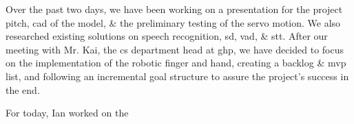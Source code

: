 
Over the past two days, we have been working on a presentation for the project pitch, \gls{cad} of the model, \& the preliminary testing of the servo motion. We also researched existing solutions on speech recognition, \gls{sd}, \gls{vad}, \& \gls{stt}. After our meeting with Mr. Kai, the \gls{cs} department head at \gls{ghp}, we have decided to focus on the implementation of the robotic finger and hand, creating a backlog \& \gls{mvp} list, and following an incremental goal structure to assure the project's success in the end.


For today, Ian worked on the 







\newpage